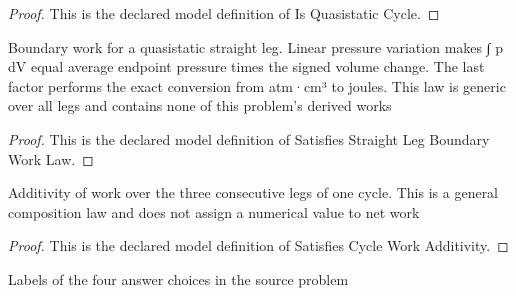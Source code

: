 \begin{proof}
  This is the declared model definition of Is Quasistatic Cycle.
\end{proof}
\begin{definition}
  \label{def:physics:phyx-mini-0417:phyxminiproblems-problemphyxmini0417-satisfiesstraightlegboundaryworklaw}
  Boundary work for a quasistatic straight leg. Linear pressure variation makes ∫ p dV equal average endpoint pressure times the signed volume change. The last factor performs the exact conversion from atm·cm³ to joules. This law is generic over all legs and contains none of this problem's derived works
\end{definition}
\begin{proof}
  This is the declared model definition of Satisfies Straight Leg Boundary Work Law.
\end{proof}
\begin{definition}
  \label{def:physics:phyx-mini-0417:phyxminiproblems-problemphyxmini0417-satisfiescycleworkadditivity}
  Additivity of work over the three consecutive legs of one cycle. This is a general composition law and does not assign a numerical value to net work
\end{definition}
\begin{proof}
  This is the declared model definition of Satisfies Cycle Work Additivity.
\end{proof}
\begin{definition}
  \label{def:physics:phyx-mini-0417:phyxminiproblems-problemphyxmini0417-answerchoice}
  Labels of the four answer choices in the source problem
\end{definition}
